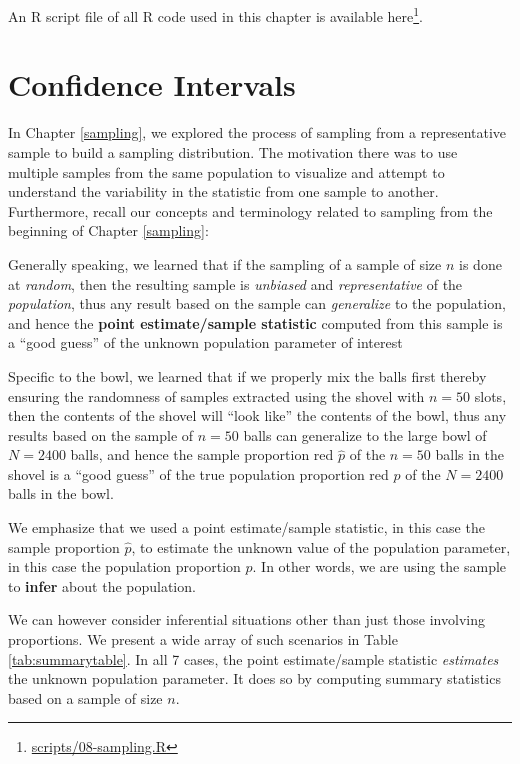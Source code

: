 \documentclass[12pt,]{krantz}
\renewcommand{\href}[2]{#2\footnote{\url{#1}}}
\begin{document}
An R script file of all R code used in this chapter is available
\href{scripts/08-sampling.R}{here}.

\chapter{Confidence Intervals}\label{confidence-intervals}

In Chapter \ref{sampling}, we explored the process of sampling from a
representative sample to build a sampling distribution. The motivation
there was to use multiple samples from the same population to visualize
and attempt to understand the variability in the statistic from one
sample to another. Furthermore, recall our concepts and terminology
related to sampling from the beginning of Chapter \ref{sampling}:

Generally speaking, we learned that if the sampling of a sample of size
\(n\) is done at \emph{random}, then the resulting sample is
\emph{unbiased} and \emph{representative} of the \emph{population}, thus
any result based on the sample can \emph{generalize} to the population,
and hence the \textbf{point estimate/sample statistic} computed from
this sample is a ``good guess'' of the unknown population parameter of
interest

Specific to the bowl, we learned that if we properly mix the balls first
thereby ensuring the randomness of samples extracted using the shovel
with \(n=50\) slots, then the contents of the shovel will ``look like''
the contents of the bowl, thus any results based on the sample of
\(n=50\) balls can generalize to the large bowl of \(N=2400\) balls, and
hence the sample proportion red \(\widehat{p}\) of the \(n=50\) balls in
the shovel is a ``good guess'' of the true population proportion red
\(p\) of the \(N=2400\) balls in the bowl.

We emphasize that we used a point estimate/sample statistic, in this
case the sample proportion \(\widehat{p}\), to estimate the unknown
value of the population parameter, in this case the population
proportion \(p\). In other words, we are using the sample to
\textbf{infer} about the population.

We can however consider inferential situations other than just those
involving proportions. We present a wide array of such scenarios in
Table \ref{tab:summarytable}. In all 7 cases, the point estimate/sample
statistic \emph{estimates} the unknown population parameter. It does so
by computing summary statistics based on a sample of size \(n\).
\end{document}
